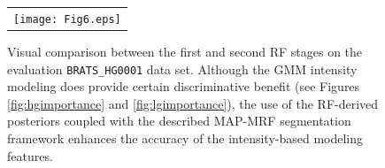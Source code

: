 

\begin{figure}
  \centering
  \begin{tabular}{c}
    \texttt{[image: Fig6.eps]}
  \end{tabular}
  \caption{Visual comparison between the first and second RF stages
  on the evaluation {\tt BRATS\_HG0001} data set.
  Although the GMM intensity modeling does provide certain 
  discriminative benefit (see Figures \ref{fig:hgimportance}
  and \ref{fig:lgimportance}), the use of the RF-derived posteriors 
  coupled with the described MAP-MRF segmentation framework enhances 
  the accuracy of the intensity-based modeling features.    
  }
  \label{fig:stageComparison}
\end{figure}




